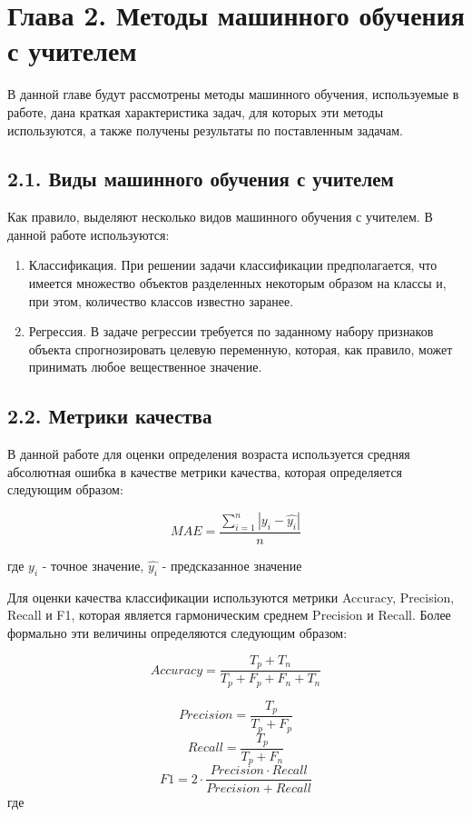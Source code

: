 \section{Глава 2. Методы машинного обучения с учителем}

В данной главе будут рассмотрены методы машинного обучения, используемые в работе, дана краткая характеристика задач, для которых эти методы используются, а также получены результаты по поставленным задачам.

\subsection{2.1. Виды машинного обучения с учителем}
Как правило, выделяют несколько видов машинного обучения с учителем. В данной работе используются:
\begin{enumerate}
\item Классификация. При решении задачи классификации предполагается, что имеется множество объектов разделенных некоторым образом на классы и, при этом, количество классов известно заранее.
\item Регрессия. В задаче регрессии требуется по заданному набору признаков объекта спрогнозировать целевую переменную, которая, как правило, может принимать любое вещественное значение.
\end{enumerate}

\subsection{2.2. Метрики качества}

В данной работе для оценки определения возраста используется средняя абсолютная ошибка в качестве метрики качества, которая определяется следующим образом:

$$
	MAE = \frac{\sum_{i=1}^{n} |y_i - \hat{y_i}|}{n}
$$

где $y_i$ - точное значение, $\hat{y_i}$ - предсказанное значение

Для оценки качества классификации используются метрики Accuracy, Precision, Recall и F1, которая является гармоническим среднем Precision и Recall. Более формально эти величины определяются следующим образом:

$$
 Accuracy= \frac{T_p + T_n}{T_p + F_p + F_n + T_n}
$$

$$
 Precision = \frac{T_p}{T_p + F_p}
$$
$$
Recall = \frac{T_p}{T_p + F_n}
$$
$$
	F1 = 2 \cdot \frac{Precision \cdot Recall}{Precision + Recall}
$$
где 

